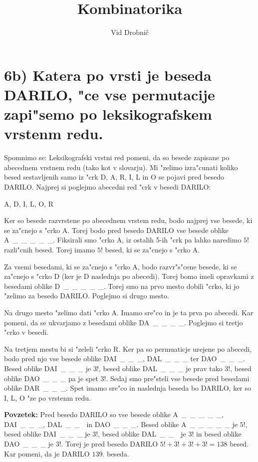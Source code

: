 \documentclass[a4paper, 12pt]{article}
\title{Kombinatorika}
\author{Vid Drobnič}
\date{}
\begin{document}
\maketitle
	
\section*{6b) Katera po vrsti je beseda DARILO, "ce vse permutacije zapi"semo po leksikografskem vrstenm redu.}
Spomnimo se: Leksikografski vrstni red pomeni, da so besede zapisane po abecednem vrstnem redu (tako kot v slovarju). Mi "zelimo izra"cunati koliko besed sestavljenih samo iz "crk D, A, R, I, L in O se pojavi pred besedo DARILO. Najprej si poglejmo abecedni red "crk v besedi DARILO:
\begin{center}
A, D, I, L, O, R
\end{center}
Ker so besede razvrstene po abecednem vrstem redu, bodo najprej vse besede, ki se za"cnejo s "crko A. Torej bodo pred besedo DARILO vse besede oblike A~\_~\_~\_~\_~\_. Fiksirali smo "crko A, iz ostalih 5-ih "crk pa lahko naredimo $5!$ razli"cnih besed. Torej imamo $5!$ besed, ki se za"cnejo s "crko A.

Za vsemi besedami, ki se za"cnejo s "crko A, bodo razvr"s"cene besede, ki se za"cnejo s "crko D (ker je D naslednja po abecedi). Torej bomo imeli opravkami z besedami oblike D~\_~\_~\_~\_~\_. Torej smo na prvo mesto dobili "crko, ki jo "zelimo za besedo DARILO. Poglejmo si drugo mesto.

Na drugo mesto "zelimo dati "crko A. Imamo sre"co in je ta prva po abecedi. Kar pomeni, da se ukvarjamo z besedami oblike DA~\_~\_~\_~\_. Poglejmo si tretjo "crko v besedi.

Na tretjem mestu bi si "zeleli "crko R. Ker pa so permuaticje urejene po abecedi, bodo pred njo vse besede oblike DAI~\_~\_~\_, DAL~\_~\_~\_ ter DAO~\_~\_~\_. Besed oblike DAI~\_~\_~\_ je $3!$, besed oblike DAL~\_~\_~\_ je prav tako $3!$, besed oblike DAO~\_~\_~\_ pa je spet $3!$. Sedaj smo pre"steli vse besede pred besedami oblike DAR~\_~\_~\_. Spet imamo sre"co in naslednja beseda bo DARILO, ker so I, L, O "ze po vrstenm redu.

\textbf{Povzetek:} Pred besedo DARILO so vse besede oblike A~\_~\_~\_~\_~\_, DAI~\_~\_~\_, DAL~\_~\_~\ in DAO~\_~\_~\_. Besed oblike A~\_~\_~\_~\_~\_ je $5!$, besed oblike DAI~\_~\_~\_ je $3!$, besed oblike DAL~\_~\_~\ je $3!$ in besed oblike DAO~\_~\_~\_ je $3!$. Torej je pred besedo DARILO $5! + 3! + 3! + 3! = 138$ besed. Kar pomeni, da je DARILO $139.$ beseda.
\end{document}
